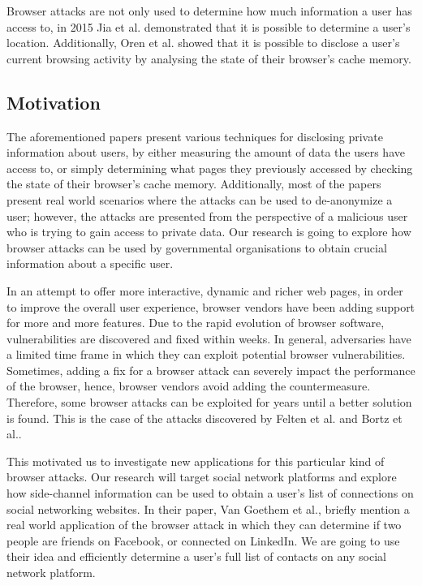 \documentclass[a4paper,11pt]{article}
\begin{document}
Browser attacks are not only used to determine how much information a user has access to, in 2015 Jia et al.\cite{jia2015know} demonstrated that it is possible to determine a user's location. Additionally, Oren et al.\cite{oren2015spy} showed that it is possible to disclose a user's current browsing activity by analysing the state of their browser's cache memory.

\subsection*{Motivation}

The aforementioned papers present various techniques for disclosing private information about users, by either measuring the amount of data the users have access to, or simply determining what pages they previously accessed by checking the state of their browser's cache memory. Additionally, most of the papers present real world scenarios where the attacks can be used to de-anonymize a user; however, the attacks are presented from the perspective of a malicious user who is trying to gain access to private data. Our research is going to explore how browser attacks can be used by governmental organisations to obtain crucial information about a specific user.

In an attempt to offer more interactive, dynamic and richer web pages, in order to improve the overall user experience, browser vendors have been adding support for more and more features. Due to the rapid evolution of browser software, vulnerabilities are discovered and fixed within weeks. In general, adversaries have a limited time frame in which they can exploit potential browser vulnerabilities. Sometimes, adding a fix for a browser attack can severely impact the performance of the browser, hence, browser vendors avoid adding the countermeasure. Therefore, some browser attacks can be exploited for years until a better solution is found. This is the case of the attacks discovered by Felten et al.\cite{felten2000timing} and Bortz et al.\cite{bortz2007exposing}.

This motivated us to investigate new applications for this particular kind of browser attacks. Our research will target social network platforms and explore how side-channel information can be used to obtain a user's list of connections on social networking websites. In their paper, Van Goethem et al.\cite{van2015clock}, briefly mention a real world application of the browser attack in which they can determine if two people are friends on Facebook, or connected on LinkedIn. We are going to use their idea and efficiently determine a user's full list of contacts on any social network platform.
\end{document}
